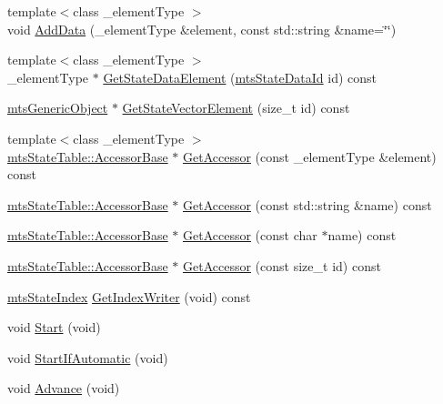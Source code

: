 \begin{DoxyCompactItemize}
\item 
{\footnotesize template$<$class \+\_\+element\+Type $>$ }\\void \hyperlink{classmts_state_table_a1353c7b1670616dc1af6eb9ef5da2fde}{Add\+Data} (\+\_\+element\+Type \&element, const std\+::string \&name=\char`\"{}\char`\"{})
\item 
{\footnotesize template$<$class \+\_\+element\+Type $>$ }\\\+\_\+element\+Type $\ast$ \hyperlink{classmts_state_table_a3a66fb9fa397c34e31ec91f2cb5acf6f}{Get\+State\+Data\+Element} (\hyperlink{mts_state_table_8h_ac3a0e34e8991d51790b043fa01857a35}{mts\+State\+Data\+Id} id) const 
\item 
\hyperlink{classmts_generic_object}{mts\+Generic\+Object} $\ast$ \hyperlink{classmts_state_table_a364ddd16f8f0feaf0ae4ba59359ca9c6}{Get\+State\+Vector\+Element} (size\+\_\+t id) const 
\item 
{\footnotesize template$<$class \+\_\+element\+Type $>$ }\\\hyperlink{classmts_state_table_1_1_accessor_base}{mts\+State\+Table\+::\+Accessor\+Base} $\ast$ \hyperlink{classmts_state_table_a34156ee2a483ae1b9c7dfc52ef1a196a}{Get\+Accessor} (const \+\_\+element\+Type \&element) const 
\item 
\hyperlink{classmts_state_table_1_1_accessor_base}{mts\+State\+Table\+::\+Accessor\+Base} $\ast$ \hyperlink{classmts_state_table_a21b4b85ce1185b4705d9684b7f61b10d}{Get\+Accessor} (const std\+::string \&name) const 
\item 
\hyperlink{classmts_state_table_1_1_accessor_base}{mts\+State\+Table\+::\+Accessor\+Base} $\ast$ \hyperlink{classmts_state_table_ae798fe3fa7241a64805d2f4f9760b5b9}{Get\+Accessor} (const char $\ast$name) const 
\item 
\hyperlink{classmts_state_table_1_1_accessor_base}{mts\+State\+Table\+::\+Accessor\+Base} $\ast$ \hyperlink{classmts_state_table_aa632462e7f9ce6240133a155e214837c}{Get\+Accessor} (const size\+\_\+t id) const 
\item 
\hyperlink{classmts_state_index}{mts\+State\+Index} \hyperlink{classmts_state_table_aece1a7ed0894a67425f3ef8ec2155e54}{Get\+Index\+Writer} (void) const 
\item 
void \hyperlink{classmts_state_table_a8414f107199e3223da2792606c40d736}{Start} (void)
\item 
void \hyperlink{classmts_state_table_a64a7f96db3647f1092daf894ad17f03a}{Start\+If\+Automatic} (void)
\item 
void \hyperlink{classmts_state_table_a0ab7ef3af48d207bf6e13748dd3d03f9}{Advance} (void)

\end{DoxyCompactItemize}
